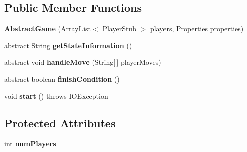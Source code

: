 \subsection*{Public Member Functions}
\begin{DoxyCompactItemize}
\item 
\hypertarget{classspartacus_1_1gameserver_1_1AbstractGame_a4df4237f133fa7b6d99f5e3db4c73c42}{
{\bfseries \-A\-b\-s\-t\-r\-a\-c\-t\-G\-a\-m\-e} \-(\-A\-r\-r\-a\-y\-L\-i\-s\-t$<$ \hyperlink{classspartacus_1_1gameserver_1_1PlayerStub}{\-P\-l\-a\-y\-e\-r\-S\-t\-u\-b} $>$ \-p\-l\-a\-y\-e\-r\-s, \-P\-r\-o\-p\-e\-r\-t\-i\-e\-s \-p\-r\-o\-p\-e\-r\-t\-i\-e\-s\-)}
\label{classspartacus_1_1gameserver_1_1AbstractGame_a4df4237f133fa7b6d99f5e3db4c73c42}

\item 
\hypertarget{classspartacus_1_1gameserver_1_1AbstractGame_ab767606f15e3859ca2bf504294b8e725}{
\-a\-b\-s\-t\-r\-a\-c\-t \-S\-t\-r\-i\-n\-g {\bfseries \-g\-e\-t\-S\-t\-a\-t\-e\-I\-n\-f\-o\-r\-m\-a\-t\-i\-o\-n} \-(\-)}
\label{classspartacus_1_1gameserver_1_1AbstractGame_ab767606f15e3859ca2bf504294b8e725}

\item 
\hypertarget{classspartacus_1_1gameserver_1_1AbstractGame_af8c88ed86e0de44f9111c53b033f015a}{
\-a\-b\-s\-t\-r\-a\-c\-t \-v\-o\-i\-d {\bfseries \-h\-a\-n\-d\-l\-e\-M\-o\-v\-e} \-(\-S\-t\-r\-i\-n\-g\mbox{[}$\,$\mbox{]} \-p\-l\-a\-y\-e\-r\-M\-o\-v\-e\-s\-)}
\label{classspartacus_1_1gameserver_1_1AbstractGame_af8c88ed86e0de44f9111c53b033f015a}

\item 
\hypertarget{classspartacus_1_1gameserver_1_1AbstractGame_ad0e776001b352d59d723aca6185e4c3c}{
\-a\-b\-s\-t\-r\-a\-c\-t \-b\-o\-o\-l\-e\-a\-n {\bfseries \-f\-i\-n\-i\-s\-h\-C\-o\-n\-d\-i\-t\-i\-o\-n} \-(\-)}
\label{classspartacus_1_1gameserver_1_1AbstractGame_ad0e776001b352d59d723aca6185e4c3c}

\item 
\hypertarget{classspartacus_1_1gameserver_1_1AbstractGame_a9b52b571da8b8204f015458b0ee6d9b0}{
\-v\-o\-i\-d {\bfseries \-s\-t\-a\-r\-t} \-(\-)  \-t\-h\-r\-o\-ws \-I\-O\-E\-x\-c\-e\-p\-t\-i\-on }
\label{classspartacus_1_1gameserver_1_1AbstractGame_a9b52b571da8b8204f015458b0ee6d9b0}

\end{DoxyCompactItemize}
\subsection*{Protected Attributes}
\begin{DoxyCompactItemize}
\item 
\hypertarget{classspartacus_1_1gameserver_1_1AbstractGame_ac799c5440d1def30affdde649e58c431}{
\-i\-n\-t {\bfseries \-n\-u\-m\-P\-l\-a\-y\-e\-r\-s}}
\label{classspartacus_1_1gameserver_1_1AbstractGame_ac799c5440d1def30affdde649e58c431}

\end{DoxyCompactItemize}


